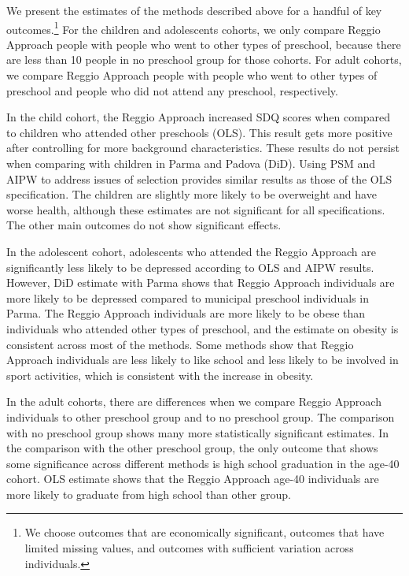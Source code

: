 We present the estimates of the methods described above for a handful of key outcomes.\footnote{We choose outcomes that are economically significant,  outcomes that have limited missing values, and outcomes with sufficient variation across individuals.} For the children and adolescents cohorts, we only compare Reggio Approach people with people who went to other types of preschool, because there are less than 10 people in no preschool group for those cohorts. For adult cohorts, we compare Reggio Approach people with people who went to other types of preschool and people who did not attend any preschool, respectively.

In the child cohort, the Reggio Approach increased SDQ scores when compared to children who attended other preschools (OLS). This result gets more positive after controlling for more background characteristics. These results do not persist when comparing with children in Parma and Padova (DiD). Using PSM and AIPW to address issues of selection provides similar results as those of the OLS specification. The children are slightly more likely to be overweight and have worse health, although these estimates are not significant for all specifications. The other main outcomes do not show significant effects.

In the adolescent cohort, adolescents who attended the Reggio Approach are significantly less likely to be depressed according to OLS and AIPW results. However, DiD estimate with Parma shows that Reggio Approach individuals are more likely to be depressed compared to municipal preschool individuals in Parma. The Reggio Approach individuals are more likely to be obese than individuals who attended other types of preschool, and the estimate on obesity is consistent across most of the methods. Some methods show that Reggio Approach individuals are less likely to like school and less likely to be involved in sport activities, which is consistent with the increase in obesity. 

In the adult cohorts, there are differences when we compare Reggio Approach individuals to other preschool group and to no preschool group. The comparison with no preschool group shows many more statistically significant estimates. In the comparison with the other preschool group, the only outcome that shows some significance across different methods is high school graduation in the age-40 cohort. OLS estimate shows that the Reggio Approach age-40 individuals are more likely to graduate from high school than other group. 

